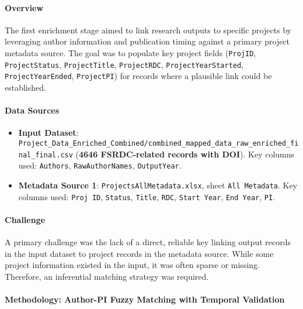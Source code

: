 \documentclass[12pt]{article}
\providecommand{\tightlist}{%
  \setlength{\itemsep}{0pt}\setlength{\parskip}{0pt}}
\begin{document}
\paragraph{Overview}\label{overview-3}

The first enrichment stage aimed to link research outputs to specific
projects by leveraging author information and publication timing against
a primary project metadata source. The goal was to populate key project
fields (\texttt{ProjID}, \texttt{ProjectStatus}, \texttt{ProjectTitle},
\texttt{ProjectRDC}, \texttt{ProjectYearStarted},
\texttt{ProjectYearEnded}, \texttt{ProjectPI}) for records where a
plausible link could be established.

\paragraph{Data Sources}\label{data-sources-2}

\begin{itemize}
\tightlist
\item
  \textbf{Input Dataset}:
  \texttt{Project\_Data\_Enriched\_Combined/combined\_mapped\_data\_raw\_enriched\_final\_final.csv}
  (\textbf{4646 FSRDC-related records with DOI}). Key columns used:
  \texttt{Authors}, \texttt{RawAuthorNames}, \texttt{OutputYear}.
\item
  \textbf{Metadata Source 1}: \texttt{ProjectsAllMetadata.xlsx}, sheet
  \texttt{All\ Metadata}. Key columns used: \texttt{Proj\ ID},
  \texttt{Status}, \texttt{Title}, \texttt{RDC}, \texttt{Start\ Year},
  \texttt{End\ Year}, \texttt{PI}.
\end{itemize}

\paragraph{Challenge}\label{challenge}

A primary challenge was the lack of a direct, reliable key linking
output records in the input dataset to project records in the metadata
source. While some project information existed in the input, it was
often sparse or missing. Therefore, an inferential matching strategy was
required.

\paragraph{Methodology: Author-PI Fuzzy Matching with Temporal
Validation}\label{methodology-author-pi-fuzzy-matching-with-temporal-validation}
\end{document}

